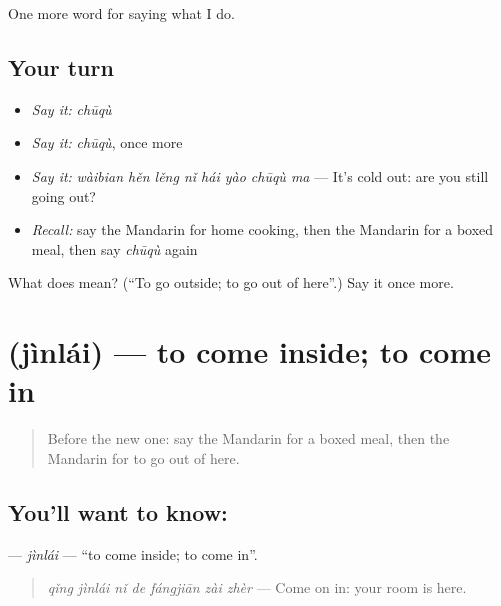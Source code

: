 \begin{grammarlens}[title={What you've built}]
One more word for saying what I do.
\end{grammarlens}

\subsection*{Your turn}
\begin{itemize}
\raggedright
  \item \emph{Say it:} \emph{chūqù}
  \item \emph{Say it:} \emph{chūqù}, once more
  \item \emph{Say it:} \emph{wàibian hěn lěng nǐ hái yào chūqù ma} — It's cold out: are you still going out?
  \item \emph{Recall:} say the Mandarin for home cooking, then the Mandarin for a boxed meal, then say \emph{chūqù} again
\end{itemize}

\begin{tcolorbox}[breakable,colback=teal!4,colframe=teal!35!black,title={Before you move on}]
What does  mean? (\textquotedblleft{}To go outside; to go out of here\textquotedblright{}.) Say it once more.
\end{tcolorbox}
\section[\texorpdfstring{\zh{进来} (jìnlái)}{进来 (jìnlái)}]{ (jìnlái) — to come inside; to come in}

\label{lesson:ZH-C183-jinlai}



\begin{quote}
Before the new one: say the Mandarin for a boxed meal, then the Mandarin for to go out of here.
\end{quote}

\subsection*{You'll want to know: }
\textbf{} — \emph{jìnlái} — \textquotedblleft{}to come inside; to come in\textquotedblright{}.

\begin{quote}
\textbf{} \emph{qǐng jìnlái nǐ de fángjiān zài zhèr} — Come on in: your room is here.
\end{quote}

